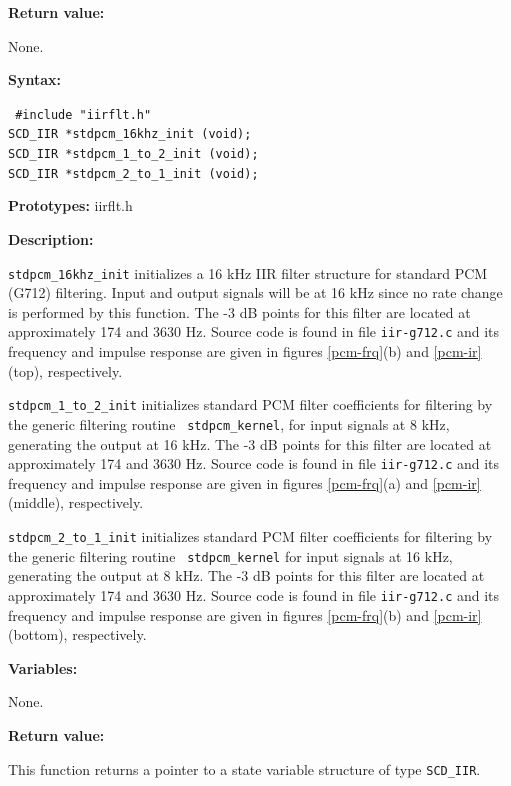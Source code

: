 {\bf Return value: }

None.



{\bf Syntax: }

{\tt
\#include "iirflt.h"\\
SCD\_IIR *stdpcm\_16khz\_init (void);\\
SCD\_IIR *stdpcm\_1\_to\_2\_init (void);\\
SCD\_IIR *stdpcm\_2\_to\_1\_init (void);
}

{\bf Prototypes: }   iirflt.h

{\bf Description: }

{\tt stdpcm\_16khz\_init} initializes a 16 kHz IIR filter structure
for standard PCM (G712) filtering. Input and output signals will be at
16 kHz since no rate change is performed by this function. The -3 dB
points for this filter are located at approximately 174 and 3630 Hz.
Source code is found in file {\tt iir-g712.c} and its frequency and
impulse response are given in figures \ref{pcm-frq}(b) and
\ref{pcm-ir} (top), respectively.

{\tt stdpcm\_1\_to\_2\_init} initializes standard PCM filter
coefficients for filtering by the generic filtering routine {\tt
stdpcm\_kernel}, for input signals at 8 kHz, generating the output at
16 kHz. The -3 dB points for this filter are located at approximately
174 and 3630 Hz. Source code is found in file {\tt iir-g712.c} and its
frequency and impulse response are given in figures \ref{pcm-frq}(a)
and \ref{pcm-ir} (middle), respectively.

{\tt stdpcm\_2\_to\_1\_init} initializes standard PCM filter
coefficients for filtering by the generic filtering routine {\tt
stdpcm\_kernel} for input signals at 16 kHz, generating the output at
8 kHz. The -3 dB points for this filter are located at approximately
174 and 3630 Hz. Source code is found in file {\tt iir-g712.c} and its
frequency and impulse response are given in figures \ref{pcm-frq}(b)
and \ref{pcm-ir} (bottom), respectively.

{\bf Variables: }

None.

{\bf Return value: }

This function returns a pointer to a state variable structure of type
{\tt SCD\_IIR}.




